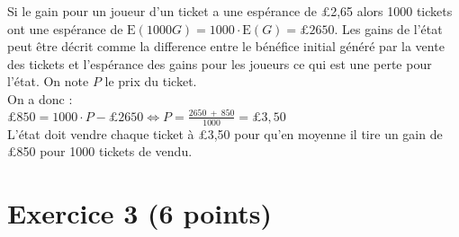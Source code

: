 \documentclass[a4paper, 12pt]{article}
\begin{document}
Si le gain pour un joueur d'un ticket a une espérance de £2,65 alors 1000 tickets ont une espérance de $\text{E}(1000G) = 1000\cdot \text{E}(G) = \pounds 2650$. 
Les gains de l'état peut être décrit comme la difference entre le bénéfice initial généré par la vente des tickets et l'espérance des gains pour les joueurs ce qui est une perte pour l'état.
On note $P$ le prix du ticket. \\
On a donc : \\
$\pounds 850 = 1000 \cdot P - \pounds 2650 \iff P = \frac{2650\ +\ 850}{1000} = \pounds 3,50$ \\
L'état doit vendre chaque ticket à £3,50 pour qu'en moyenne il tire un gain de £850 pour 1000 tickets de vendu.
\vspace{1cm}

{}
\section*{Exercice 3 (6 points)}
\end{document}
